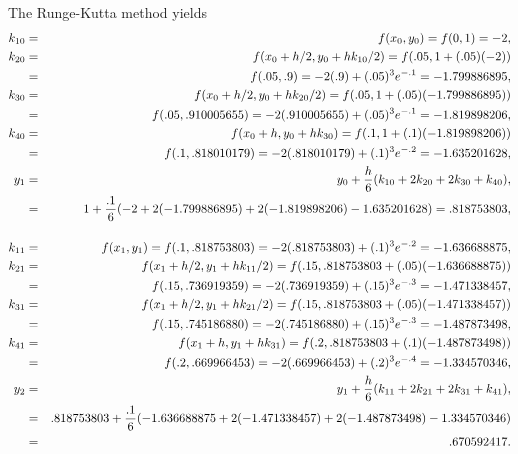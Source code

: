 \begin{examplesolution}
The Runge-Kutta method yields
\begin{eqnarray*}
  k_{10} & = & f(x_{0},y_{0})=f(0,1)=-2,                                                         \\
  k_{20} & = & f(x_{0}+h/2,y_{0}+hk_{10}/2)=f(.05,1+(.05)(-2))                                   \\
         & = & f(.05,.9)=-2(.9)+(.05)^{3}e^{-.1}=-1.799886895,                                   \\
  k_{30} & = & f(x_{0}+h/2,y_{0}+hk_{20}/2)=f(.05,1+(.05)(-1.799886895))                         \\
         & = & f(.05,.910005655)=-2(.910005655)+(.05)^{3}e^{-.1}=-1.819898206,                   \\
  k_{40} & = & f(x_{0}+h,y_{0}+hk_{30})=f(.1,1+(.1)(-1.819898206))                               \\
         & = & f(.1,.818010179)=-2(.818010179)+(.1)^{3}e^{-.2}=-1.635201628,                     \\
  y_{1}  & = & y_{0}+\frac{h}{6}(k_{10}+2k_{20}+2k_{30}+k_{40}),                                 \\
         & = & 1+\frac{.1}{6}(-2+2(-1.799886895)+2(-1.819898206)-1.635201628)=.818753803,        \\[4\jot]
  k_{11} & = & f(x_{1},y_{1})=f(.1,.818753803)=-2(.818753803)+(.1)^{3}e^{-.2}=-1.636688875,     \\
  k_{21} & = & f(x_{1}+h/2,y_{1}+hk_{11}/2)=f(.15,.818753803+(.05)(-1.636688875))                \\
         & = & f(.15,.736919359)=-2(.736919359)+(.15)^{3}e^{-.3}=-1.471338457,                   \\
  k_{31} & = & f(x_{1}+h/2,y_{1}+hk_{21}/2)=f(.15,.818753803+(.05)(-1.471338457))                \\
         & = & f(.15,.745186880)=-2(.745186880)+(.15)^{3}e^{-.3}=-1.487873498,                   \\
  k_{41} & = & f(x_{1}+h,y_{1}+hk_{31})=f(.2,.818753803+(.1)(-1.487873498))                      \\
         & = & f(.2,.669966453)=-2(.669966453)+(.2)^{3}e^{-.4}=-1.334570346,                     \\
  y_{2}  & = & y_{1}+\frac{h}{6}(k_{11}+2k_{21}+2k_{31}+k_{41}),                                 \\
         & = & .818753803+\frac{.1}{6}(-1.636688875+2(-1.471338457)+2(-1.487873498)-1.334570346) \\
         & = & .670592417.
\end{eqnarray*}
\end{examplesolution}

